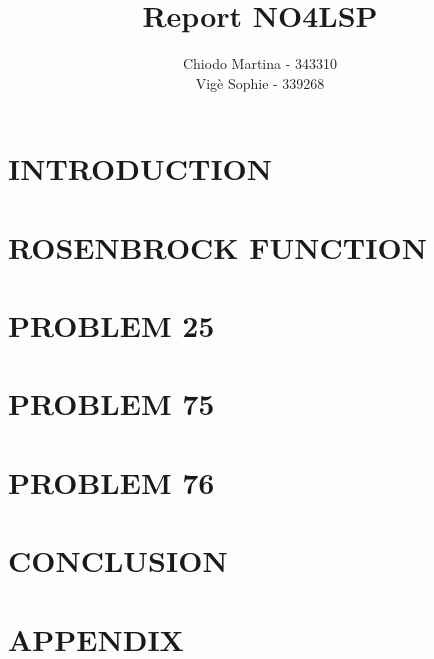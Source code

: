 \documentclass{article}
\title{Report NO4LSP}
\author{Chiodo Martina - 343310 \\ Vigè Sophie - 339268}
\date{}
\begin{document}
%



\section*{INTRODUCTION}


\clearpage
\section*{ROSENBROCK FUNCTION}


\clearpage
\section*{PROBLEM 25}


\clearpage
\section*{PROBLEM 75}


\clearpage
\section*{PROBLEM 76}


\clearpage
\section*{CONCLUSION}


\clearpage
\section*{APPENDIX}

\end{document}
